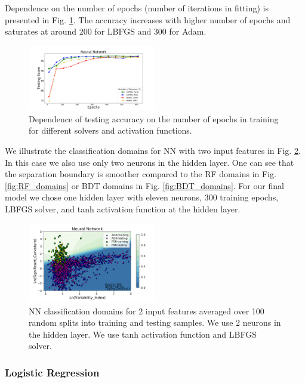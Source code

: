 Dependence on the number of epochs (number of iterations in fitting) is presented in Fig. \ref{fig:NN_epochs}. 
The accuracy increases with higher number of epochs and saturates at around 200 for LBFGS and 300 for Adam. 




\begin{figure}[h]
\centering
\hspace*{-0.5cm}
\includegraphics[width=0.5\textwidth]{plots/nn_train_epochs_assocnewfeat.pdf}
\caption{
Dependence of testing accuracy on the number of epochs in training for different solvers and activation functions.
}
\label{fig:NN_epochs}
\end{figure}
 
We illustrate the classification domains for NN with two input features in Fig. \ref{fig:NN_domains}. 
In this case we also use only two neurons in the hidden layer.
One can see that the separation boundary is smoother compared to the RF domains in Fig. \ref{fig:RF_domains} or BDT domains in Fig. \ref{fig:BDT_domains}.
For our final model we chose one hidden layer with eleven neurons, 300 training epochs, LBFGS solver, and tanh activation function at the hidden layer.


\begin{figure}[h]
\centering
\includegraphics[width=0.5\textwidth]{plots/classification_domains/nn_300_lbfgs.pdf}
\caption{NN classification domains for 2 input features
averaged over 100 random splits into training and testing samples.
We use 2 neurons in the hidden layer. 
We use tanh activation function and LBFGS solver. 
}
\label{fig:NN_domains}
\end{figure}

\subsubsection{Logistic Regression}

